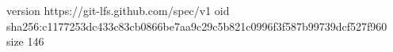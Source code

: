 version https://git-lfs.github.com/spec/v1
oid sha256:c1177253dc433c83cb0866be7aa9c29c5b821c0996f3f587b99739dcf527f960
size 146
